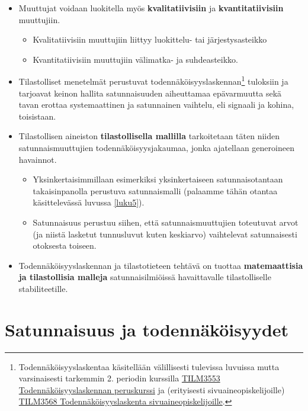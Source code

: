 \documentclass[
]{book}
\providecommand{\tightlist}{%
  \setlength{\itemsep}{0pt}\setlength{\parskip}{0pt}}
\begin{document}
\begin{itemize}
\tightlist
\item
  Muuttujat voidaan luokitella myös \textbf{kvalitatiivisiin} ja \textbf{kvantitatiivisiin} muuttujiin.

  \begin{itemize}
  \tightlist
  \item
    Kvalitatiivisiin muuttujiin liittyy luokittelu- tai järjestysasteikko
  \item
    Kvantitatiivisiin muuttujiin välimatka- ja suhdeasteikko.
  \end{itemize}
\item
  Tilastolliset menetelmät perustuvat todennäköisyyslaskennan\footnote{Todennäköisyyslaskentaa käsitellään välillisesti tulevissa luvuissa mutta varsinaisesti tarkemmin 2. periodin kurssilla \href{https://opas.peppi.utu.fi/fi/opintojakso/TILM3553/1734?period=2022-2024}{TILM3553 Todennäköisyyslaskennan peruskurssi} ja (erityisesti sivuaineopiskelijoille) \href{https://opas.peppi.utu.fi/fi/opintojakso/TILM3568/3385?period=2022-2024}{TILM3568 Todennäköisyyslaskenta sivuaineopiskelijoille}.} tuloksiin ja tarjoavat keinon hallita satunnaisuuden aiheuttamaa epävarmuutta sekä tavan erottaa systemaattinen ja satunnainen vaihtelu, eli signaali ja kohina, toisistaan.
\item
  Tilastollisen aineiston \textbf{tilastollisella mallilla} tarkoitetaan täten niiden satunnaismuuttujien todennäköisyysjakaumaa, jonka ajatellaan generoineen havainnot.

  \begin{itemize}
  \tightlist
  \item
    Yksinkertaisimmillaan esimerkiksi yksinkertaiseen satunnaisotantaan takaisinpanolla perustuva satunnaismalli (palaamme tähän otantaa käsittelevässä luvussa \ref{luku5}).
  \item
    Satunnaisuus perustuu siihen, että satunnaismuuttujien toteutuvat arvot (ja niistä lasketut tunnusluvut kuten keskiarvo) vaihtelevat satunnaisesti otoksesta toiseen.
  \end{itemize}
\item
  Todennäköisyyslaskennan ja tilastotieteen tehtävä on tuottaa \textbf{matemaattisia ja tilastollisia malleja} satunnaisilmiöissä havaittavalle tilastolliselle stabiliteetille.
\end{itemize}

\hypertarget{alaluku42}{%
\section{Satunnaisuus ja todennäköisyydet}\label{alaluku42}}
\end{document}
